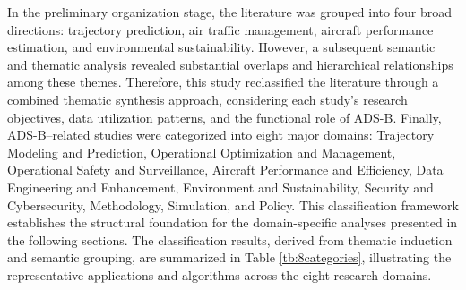 In the preliminary organization stage, the literature was grouped into four broad directions: trajectory prediction, air traffic management, aircraft performance estimation, and environmental sustainability. However, a subsequent semantic and thematic analysis revealed substantial overlaps and hierarchical relationships among these themes. Therefore, this study reclassified the literature through a combined thematic synthesis approach, considering each study’s research objectives, data utilization patterns, and the functional role of ADS-B. Finally, ADS-B–related studies were categorized into eight major domains:
Trajectory Modeling and Prediction, Operational Optimization and Management, Operational Safety and Surveillance, Aircraft Performance and Efficiency, Data Engineering and Enhancement, Environment and Sustainability, Security and Cybersecurity, Methodology, Simulation, and Policy. This classification framework establishes the structural foundation for the domain-specific analyses presented in the following sections. The classification results, derived from thematic induction and semantic grouping, are summarized in Table \ref{tb:8categories}, illustrating the representative applications and algorithms across the eight research domains.

